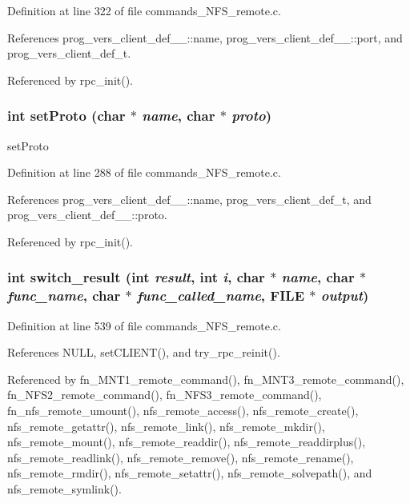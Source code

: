 Definition at line 322 of file commands\_\-NFS\_\-remote.c.

References prog\_\-vers\_\-client\_\-def\_\-\_\-::name, prog\_\-vers\_\-client\_\-def\_\-\_\-::port, and prog\_\-vers\_\-client\_\-def\_\-t.

Referenced by rpc\_\-init().
\subsubsection{\setlength{\rightskip}{0pt plus 5cm}int set\-Proto (char $\ast$ {\em name}, char $\ast$ {\em proto})}\label{commands__NFS__remote_8c_a26}


set\-Proto 

Definition at line 288 of file commands\_\-NFS\_\-remote.c.

References prog\_\-vers\_\-client\_\-def\_\-\_\-::name, prog\_\-vers\_\-client\_\-def\_\-t, and prog\_\-vers\_\-client\_\-def\_\-\_\-::proto.

Referenced by rpc\_\-init().
\subsubsection{\setlength{\rightskip}{0pt plus 5cm}int switch\_\-result (int {\em result}, int {\em i}, char $\ast$ {\em name}, char $\ast$ {\em func\_\-name}, char $\ast$ {\em func\_\-called\_\-name}, FILE $\ast$ {\em output})}\label{commands__NFS__remote_8c_a32}




Definition at line 539 of file commands\_\-NFS\_\-remote.c.

References NULL, set\-CLIENT(), and try\_\-rpc\_\-reinit().

Referenced by fn\_\-MNT1\_\-remote\_\-command(), fn\_\-MNT3\_\-remote\_\-command(), fn\_\-NFS2\_\-remote\_\-command(), fn\_\-NFS3\_\-remote\_\-command(), fn\_\-nfs\_\-remote\_\-umount(), nfs\_\-remote\_\-access(), nfs\_\-remote\_\-create(), nfs\_\-remote\_\-getattr(), nfs\_\-remote\_\-link(), nfs\_\-remote\_\-mkdir(), nfs\_\-remote\_\-mount(), nfs\_\-remote\_\-readdir(), nfs\_\-remote\_\-readdirplus(), nfs\_\-remote\_\-readlink(), nfs\_\-remote\_\-remove(), nfs\_\-remote\_\-rename(), nfs\_\-remote\_\-rmdir(), nfs\_\-remote\_\-setattr(), nfs\_\-remote\_\-solvepath(), and nfs\_\-remote\_\-symlink().
